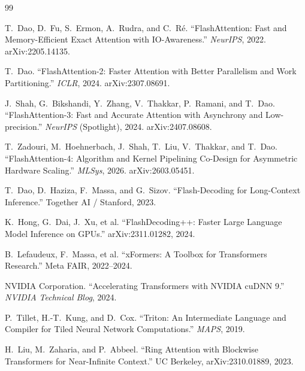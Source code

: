 \documentclass[11pt,a4paper]{article}
\begin{document}
\begin{thebibliography}{99}

 T.~Dao, D.~Fu, S.~Ermon, A.~Rudra, and C.~R\'{e}.
\newblock ``FlashAttention: Fast and Memory-Efficient Exact Attention with IO-Awareness.''
\newblock \textit{NeurIPS}, 2022. arXiv:2205.14135.

 T.~Dao.
\newblock ``FlashAttention-2: Faster Attention with Better Parallelism and Work Partitioning.''
\newblock \textit{ICLR}, 2024. arXiv:2307.08691.

 J.~Shah, G.~Bikshandi, Y.~Zhang, V.~Thakkar, P.~Ramani, and T.~Dao.
\newblock ``FlashAttention-3: Fast and Accurate Attention with Asynchrony and Low-precision.''
\newblock \textit{NeurIPS} (Spotlight), 2024. arXiv:2407.08608.

 T.~Zadouri, M.~Hoehnerbach, J.~Shah, T.~Liu, V.~Thakkar, and T.~Dao.
\newblock ``FlashAttention-4: Algorithm and Kernel Pipelining Co-Design for Asymmetric Hardware Scaling.''
\newblock \textit{MLSys}, 2026. arXiv:2603.05451.

 T.~Dao, D.~Haziza, F.~Massa, and G.~Sizov.
\newblock ``Flash-Decoding for Long-Context Inference.''
\newblock Together AI / Stanford, 2023.

 K.~Hong, G.~Dai, J.~Xu, et al.
\newblock ``FlashDecoding++: Faster Large Language Model Inference on GPUs.''
\newblock arXiv:2311.01282, 2024.

 B.~Lefaudeux, F.~Massa, et al.
\newblock ``xFormers: A Toolbox for Transformers Research.''
\newblock Meta FAIR, 2022--2024.

 NVIDIA Corporation.
\newblock ``Accelerating Transformers with NVIDIA cuDNN 9.''
\newblock \textit{NVIDIA Technical Blog}, 2024.

 P.~Tillet, H.-T.~Kung, and D.~Cox.
\newblock ``Triton: An Intermediate Language and Compiler for Tiled Neural Network Computations.''
\newblock \textit{MAPS}, 2019.

 H.~Liu, M.~Zaharia, and P.~Abbeel.
\newblock ``Ring Attention with Blockwise Transformers for Near-Infinite Context.''
\newblock UC Berkeley, arXiv:2310.01889, 2023.


\end{thebibliography}
\end{document}
